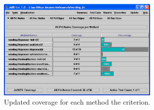 \begin{figure}[!ht]
\begin{center}
\includegraphics[width=0.70\textwidth]{fig/summary-by-method-tc1.eps}
\caption{\label{fig:summary-method-input1} Updated coverage for
each method \wrt the  criterion.}
\end{center}
\end{figure}
